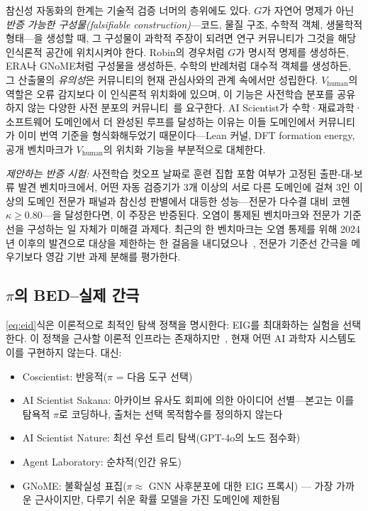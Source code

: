 \documentclass[11pt]{article}
\begin{document}
참신성 자동화의 한계는 기술적 검증 너머의 층위에도 있다. $G$가 자연어 명제가 아닌 \emph{반증 가능한 구성물(falsifiable construction)}---코드, 물질 구조, 수학적 객체, 생물학적 형태---을 생성할 때, 그 구성물이 과학적 주장이 되려면 연구 커뮤니티가 그것을 해당 인식론적 공간에 위치시켜야 한다. Robin의 경우처럼 $G$가 명시적 명제를 생성하든, ERA나 GNoME처럼 구성물을 생성하든, 수학의 반례처럼 대수적 객체를 생성하든, 그 산출물의 \emph{유의성}은 커뮤니티의 현재 관심사와의 관계 속에서만 성립한다. $V_\text{human}$의 역할은 오류 감지보다 이 인식론적 위치화에 있으며, 이 기능은 사전학습 분포를 공유하지 않는 다양한 사전 분포의 커뮤니티~\citep{taniguchi2024cpc}를 요구한다. AI Scientist가 수학·재료과학·소프트웨어 도메인에서 더 완성된 루프를 달성하는 이유는 이들 도메인에서 커뮤니티가 이미 번역 기준을 형식화해두었기 때문이다---Lean 커널, DFT formation energy, 공개 벤치마크가 $V_\text{human}$의 위치화 기능을 부분적으로 대체한다.

\textit{제안하는 반증 시험:} 사전학습 컷오프 날짜로 훈련 집합 포함 여부가 고정된 출판-대-보류 발견 벤치마크에서, 어떤 자동 검증기가 3개 이상의 서로 다른 도메인에 걸쳐 3인 이상의 도메인 전문가 패널과 참신성 판별에서 대등한 성능---전문가 다수결 대비 코헨 $\kappa \geq 0.80$---을 달성한다면, 이 주장은 반증된다. 오염이 통제된 벤치마크와 전문가 기준선을 구성하는 일 자체가 미해결 과제다. 최근의 한 벤치마크는 오염 통제를 위해 2024년 이후의 발견으로 대상을 제한하는 한 걸음을 내디뎠으나~\citep{liu2025researchbench}, 전문가 기준선 간극을 메우기보다 영감 기반 과제 분해를 평가한다.

\subsection{$\pi$의 BED--실제 간극}

\ref{eq:eid}식은 이론적으로 최적인 탐색 정책을 명시한다: EIG를 최대화하는 실험을 선택한다. 이 정책을 근사할 이론적 인프라는 존재하지만~\citep{foster2019variational,foster2021dad,blau2022rl}, 현재 어떤 AI 과학자 시스템도 이를 구현하지 않는다. 대신:

\begin{itemize}
  \item Coscientist: 반응적($\pi$ = 다음 도구 선택)
  \item AI Scientist Sakana: 아카이브 유사도 회피에 의한 아이디어 선별---본고는 이를 탐욕적 $\pi$로 코딩하나, 출처는 선택 목적함수를 정의하지 않는다
  \item AI Scientist Nature: 최선 우선 트리 탐색(GPT-4o의 노드 점수화)
  \item Agent Laboratory: 순차적(인간 유도)
  \item GNoME: 불확실성 표집($\pi \approx$ GNN 사후분포에 대한 EIG 프록시) --- 가장 가까운 근사이지만, 다루기 쉬운 확률 모델을 가진 도메인에 제한됨
\end{itemize}
\end{document}
